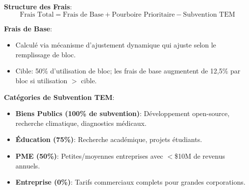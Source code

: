 \documentclass[11pt]{article}
\begin{document}
\textbf{Structure des Frais}:
\begin{equation}
\text{Frais Total} = \text{Frais de Base} + \text{Pourboire Prioritaire} - \text{Subvention TEM}
\end{equation}

\textbf{Frais de Base}:
\begin{itemize}[noitemsep]
  \item Calculé via mécanisme d'ajustement dynamique qui ajuste selon le remplissage de bloc.
  \item Cible: 50\% d'utilisation de bloc; les frais de base augmentent de 12,5\% par bloc si utilisation $>$ cible.
\end{itemize}

\textbf{Catégories de Subvention TEM}:
\begin{itemize}[noitemsep]
  \item \textbf{Biens Publics (100\% de subvention)}: Développement open-source, recherche climatique, diagnostics médicaux.
  \item \textbf{Éducation (75\%)}: Recherche académique, projets étudiants.
  \item \textbf{PME (50\%)}: Petites/moyennes entreprises avec $<$\$10M de revenus annuels.
  \item \textbf{Entreprise (0\%)}: Tarifs commerciaux complets pour grandes corporations.
\end{itemize}
\end{document}
